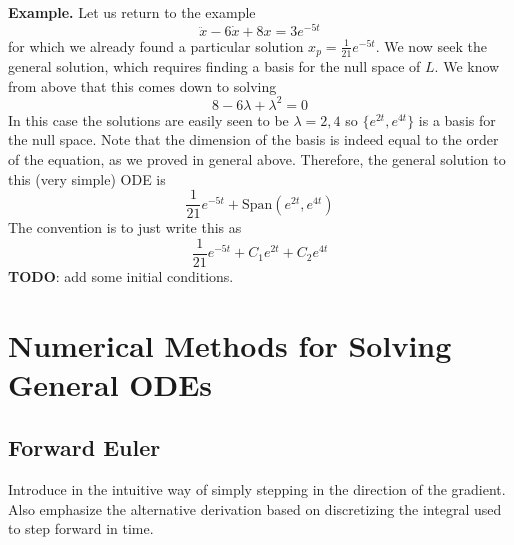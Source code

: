 \documentclass[12pt]{article}
\begin{document}
\bigskip
\noindent
\textbf{Example.} Let us return to the example
\[\ddot{x} - 6\dot{x} + 8x = 3e^{-5t}\]
for which we already found a particular solution $x_p = \frac{1}{21} e^{-5t}$. We now seek the general solution, which requires finding a basis 
for the null space of $L$. We know from above that this comes down to solving 
\[8 - 6\lambda + \lambda^2 = 0\]
In this case the solutions are easily seen to be $\lambda = 2, 4$ so $\{e^{2t}, e^{4t}\}$ is a basis for the null space. Note that the dimension of the basis
is indeed equal to the order of the equation, as we proved in general above. Therefore, the general solution to this (very simple) ODE is 
\[\frac{1}{21} e^{-5t} + \text{Span}\left(e^{2t}, e^{4t}\right)\]
The convention is to just write this as 
\[\frac{1}{21} e^{-5t} + C_1 e^{2t} + C_2 e^{4t}  \]
\textbf{TODO}: add some initial conditions. 

\section{Numerical Methods for Solving General ODEs}

\subsection{Forward Euler}
Introduce in the intuitive way of simply stepping in the direction of the gradient. Also emphasize the alternative derivation based on discretizing the integral used to 
step forward in time. 
\end{document}
